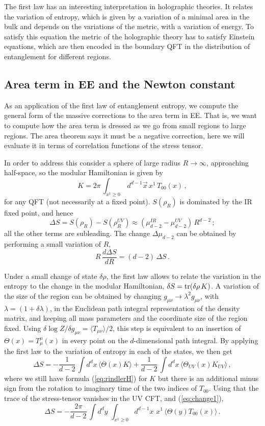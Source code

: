 \documentclass[12pt]{article}
\numberwithin{equation}{section}
\newcommand{\be}{\begin{equation}}
\newcommand{\ee}{\end{equation}}
\begin{document}
The first law has an interesting interpretation in holographic theories. It relates the variation of entropy, which is given by a variation of a minimal area in the bulk and depends on the variations of the metric, with a variation of energy. To satisfy this equation the metric of the holographic theory has to satisfy Einstein equations, which are then encoded in the boundary QFT in the distribution of entanglement for different regions.   

\subsection{Area term in EE and the Newton constant}

As an application of the first law of entanglement entropy, we compute the general form of the massive corrections to the area term in EE. That is, we want to compute how the area term is dressed as we go from small regions to large regions. The area theorem says it must be a negative correction, here we will evaluate it in terms of correlation functions of the stress tensor. 


In order to address this  consider a sphere of large radius $R\rightarrow \infty$, approaching  half-space, so the modular Hamiltonian is given by
\be\label{eq:rindlerH}
 K =2\pi\,\int_{x^1 \ge 0}\, d^{d-1}\vec x\,x^1\,T_{00}(x)\,,
\ee
for any QFT (not necessarily at a fixed point). $S(\rho_R)$ is dominated by the IR fixed point, and hence
\be
\Delta S = S(\rho_R)-S(\rho^{UV}_R) \approx ( \mu_{d-2}^{IR}- \mu_{d-2}^{UV})\,R^{d-2}\,;
\ee
all the other terms are subleading. The change $\Delta  \mu_{d-2}$ can be obtained by performing a small variation of $R$,
\be\label{eq:change1}
R\,\frac{d \Delta S}{dR}=(d-2)\,\Delta S\,.
\ee

Under a small change of state $\delta \rho$, the first law allows to relate the variation in the entropy to the change in the modular Hamiltonian, $\delta S =  {\rm tr}(\delta \rho\, K )$. 
 A variation of the size of the region can be obtained by changing $g_{\mu\nu}\rightarrow \lambda^2 g_{\mu\nu}$, with $\lambda=(1+\delta \lambda)$,  in the Euclidean path
integral representation of the density matrix, and keeping all mass parameters and the coordinate size of the region fixed. Using $\delta \log Z/\delta g_{\mu\nu}= \langle T_{\mu\nu}\rangle/2$, this step is equivalent to an insertion of $\Theta(x)=T_{\mu}^\mu(x)$ in every point on the $d$-dimensional path integral.
 By applying the first law to the variation of entropy in each of the states,   we then get
\be\label{eq:DeltaS1}
\Delta S = -\frac{1}{d-2}\,\int d^dx\,\langle \Theta(x) K \rangle+\frac{1}{d-2}\,\int d^dx\,\langle \Theta_{UV}(x) K_{UV} \rangle\,,
\ee
where we still have formula (\ref{eq:rindlerH}) for $K$ but there is an additional  minus sign from the rotation to imaginary time of the two indices of $T_{00}$. 
Using that the trace of the stress-tensor vanishes in the UV CFT, and (\ref{eq:change1}), 
\be\label{eq:DeltaS3}
\Delta S=-\frac{2\pi}{d-2}\,\int d^dy\,\,\int_{x^1\ge 0} d^{d-1}x\,\,x^1\,\langle \Theta(y) T_{00}(x) \rangle\,.
\ee
\end{document}
